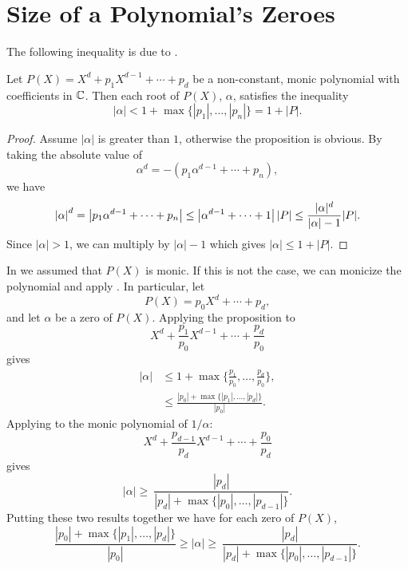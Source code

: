 \section{Size of a Polynomial's Zeroes}
\label{PB:RootSize:Sec}

The following inequality is due to {\Cauchy}
\cite{Cauchy:Exercises}.

\begin{proposition}[Cauchy]
\label{Cauchy:Zero:Bound:Prop}
Let $P(X) = X^{d} + p_{1} X^{d-1} + \cdots + p_{d}$ be a non-constant,
monic polynomial with coefficients in $\mathbb{C}$.  Then each root of $P(X)$,
$\alpha$, satisfies the inequality
\begin{equation}
\label{Cauchy:Zero:Ineq:Eq}
\left|\alpha\right| < 1 + \max \{|p_{1}|, \ldots, |p_{n}|\} 
  = 1 + \left| P \right|.
\end{equation}
\end{proposition}

\begin{proof}
Assume $|\alpha|$ is greater than $1$, otherwise the proposition is obvious.
By taking the absolute value of 
\[
\alpha^d = -(p_{1} \alpha^{d-1} + \cdots + p_{n}),
\]
we have
\[
\left| \alpha \right|^{d} = \left| p_{1} \alpha^{d-1} + \cdots + p_{n} \right|
 \le \left| \alpha^{d-1} + \cdots + 1 \right| |P| 
 \le { |\alpha|^{d} \over |\alpha| - 1} |P|.
\]
Since $|\alpha| > 1$, we can multiply by $|\alpha| - 1$ which gives 
$|\alpha| \le 1 + |P|$. 
\end{proof}

In  we assumed that $P(X)$ is monic.  If this is not the case, we
can monicize the polynomial and apply .  In
particular, let 
\[
P(X) = p_{0} X^{d} + \cdots + p_{d},
\]
and let $\alpha$ be a zero of $P(X)$.  Applying the proposition to
\[
X^{d} + \frac{p_{1}}{p_{0}}X^{d-1} + \cdots + \frac{p_{d}}{p_{0}}
\]
gives
\[
\begin{aligned}
|\alpha| & 
   \le 1 + \max\{ \frac{p_{1}}{p_{0}}, \ldots, \frac{p_{d}}{p_{0}} \},\\
 & \le \frac{\left|p_{0}\right| + 
               \max \{\left|p_{1}\right|, \ldots, \left|p_{d}\right|
\}}{\left|p_{0}\right|}.
\end{aligned}
\]
Applying  to the monic polynomial of
$1/\alpha$:
\[
X^{d} + \frac{p_{d-1}}{p_{d}} X^{d-1} + \cdots + \frac{p_{0}}{p_{d}}
\]
gives
\[
|\alpha| \ge \ \frac{\left|p_{d}\right|}{\left|p_{d}\right| + 
   \max\{ \left|p_{0}\right|, \ldots, \left|p_{d-1}\right|\}}.
\]
Putting these two results together we have for each zero of $P(X)$,
\[
\frac{\left|p_{0}\right| + 
               \max \{\left|p_{1}\right|, \ldots, \left|p_{d}\right|
\}}{\left|p_{0}\right|}
\ge
|\alpha| \ge \ \frac{\left|p_{d}\right|}{\left|p_{d}\right| + 
   \max\{ \left|p_{0}\right|, \ldots, \left|p_{d-1}\right|\}}.
\]

